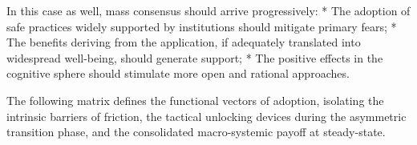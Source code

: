 \documentclass[11pt,a4paper,oneside]{article} %
\begin{document}
\hypertarget{popular-acceptance}{%
\label{popular-acceptance}}

In this case as well, mass consensus should arrive progressively: * The
adoption of safe practices widely supported by institutions should
mitigate primary fears; * The benefits deriving from the application, if
adequately translated into widespread well-being, should generate
support; * The positive effects in the cognitive sphere should stimulate
more open and rational approaches.

\hypertarget{the-anthropic-acceptance-matrix}{%
\label{the-anthropic-acceptance-matrix}}

The following matrix defines the functional vectors of adoption,
isolating the intrinsic barriers of friction, the tactical unlocking
devices during the asymmetric transition phase, and the consolidated
macro-systemic payoff at steady-state.
\end{document}
